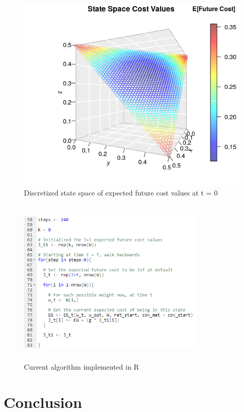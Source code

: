 \documentclass{article}
\begin{document}
\begin{figure}
	\includegraphics[width=\textwidth]{Optimal-Weight-Plot-v2.png} 	
	\caption{Discretized state space of expected future cost values at t = 0}
	\label{fig:optimal-space} 
\end{figure}

\begin{figure}
	\centering
	\includegraphics[width=9cm, height=8cm]{results/plots/code-error1}
	\caption{Current algorithm implemented in R}
	\label{fig:code-error1}
\end{figure}
 

\section{Conclusion}
\end{document}
